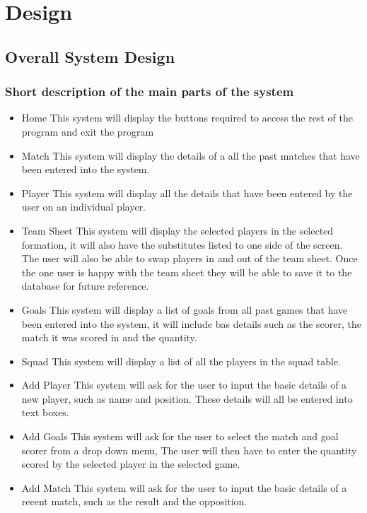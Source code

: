 \chapter{Design}


\section{Overall System Design}

\subsection{Short description of the main parts of the system}
\begin{itemize}
\item Home
This system will display the buttons required to access the rest of the program and exit the program
\item Match
This system will display the details of a all the past matches that have been entered into the system. 
\item Player 
This system  will display all the details that have been entered by the user on an individual player.  
\item Team Sheet
This system will display the selected players in the selected formation, it will also have the substitutes listed to one side of the screen. The user will also be able to swap players in and out of the team sheet. Once the one user is happy with the team sheet they will be able to save it to the database for future reference. 
\item Goals
This system will display a list of goals from all past games that have been entered into the system, it will include bas details such as the scorer, the match it was scored in and the quantity.
\item Squad
This system will display a list of all the players in the squad table.
\item Add Player
This system will ask for the user to input the basic details of a new player, such as name and position. These details will all be entered into text boxes.
\item Add Goals
This system will ask for the user to select the match and goal scorer from a drop down menu, The user will then have to enter the quantity scored by the selected player in the selected game. 
\item Add Match
This system will ask for the user to input the basic details of a recent match, such as the result and the opposition.

\end{itemize}
